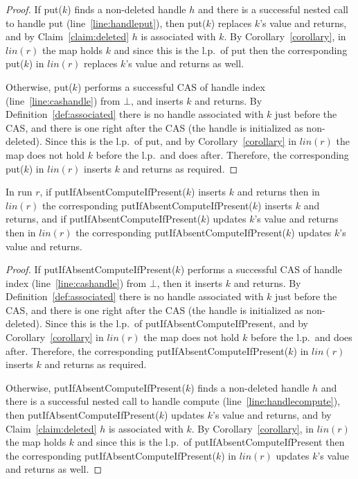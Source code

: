 \begin{proof}
If put($k$) finds a non-deleted handle $h$ and there is a successful nested call to handle put (line~\ref{line:handleput}), then put($k$) replaces $k$'s value and returns, and by Claim~\ref{claim:deleted} $h$ is associated with $k$. 
By Corollary~\ref{corollary}, in $lin(r)$ the map holds $k$ and since this is the l.p.\ of put then the corresponding put($k$) in $lin(r)$ replaces $k$'s value and returns as well.

Otherwise, put($k$) performs a successful CAS of handle index (line~\ref{line:cashandle}) from $\bot$, and inserts $k$ and returns. By Definition~\ref{def:associated} there is no handle associated with $k$ just before the CAS, and there is one right after the CAS (the handle is initialized as non-deleted).
Since this is the l.p.\ of put, and by Corollary~\ref{corollary} in $lin(r)$ the map does not hold $k$ before the l.p.\ and does after.
Therefore, the corresponding put($k$) in $lin(r)$ inserts $k$ and returns as required.
\end{proof}

\begin{claim}[PutIfAbsentComputeIfPresent]
In run $r$, if \newline putIfAbsentComputeIfPresent($k$) inserts $k$ and returns then in $lin(r)$ the corresponding putIfAbsentComputeIfPresent($k$) inserts $k$ and returns, and if putIfAbsentComputeIfPresent($k$) updates $k$'s value and returns then in $lin(r)$ the corresponding putIfAbsentComputeIfPresent($k$) updates $k$'s value and returns.
\end{claim}

\begin{proof}
If putIfAbsentComputeIfPresent($k$) performs a successful CAS of handle index (line~\ref{line:cashandle}) from $\bot$, then it inserts $k$ and returns.
By Definition~\ref{def:associated} there is no handle associated with $k$ just before the CAS, and there is one right after the CAS (the handle is initialized as non-deleted).
Since this is the l.p.\ of putIfAbsentComputeIfPresent, and by Corollary~\ref{corollary} in $lin(r)$ the map does not hold $k$ before the l.p.\ and does after.
Therefore, the corresponding putIfAbsentComputeIfPresent($k$) in $lin(r)$ inserts $k$ and returns as required.

Otherwise, putIfAbsentComputeIfPresent($k$) finds a non-deleted handle $h$ and there is a successful nested call to handle compute (line~\ref{line:handlecompute}), then putIfAbsentComputeIfPresent($k$) updates $k$'s value and returns, and by Claim~\ref{claim:deleted} $h$ is associated with $k$.
By Corollary~\ref{corollary}, in $lin(r)$ the map holds $k$ and since this is the l.p.\ of putIfAbsentComputeIfPresent then the corresponding putIfAbsentComputeIfPresent($k$) in $lin(r)$ updates $k$'s value and returns as well.
\end{proof}

